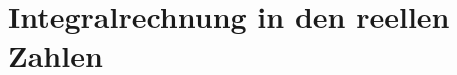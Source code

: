 \documentclass[../main.tex]{subfiles}
\begin{document}
\chapter{Integralrechnung in den reellen Zahlen}
\end{document}
